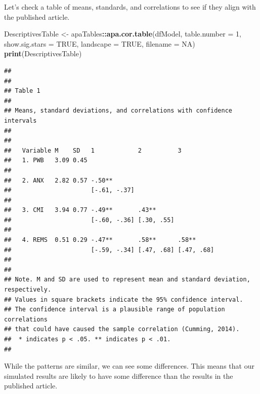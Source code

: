 \documentclass[
  11pt,
]{book}
\newenvironment{Shaded}{\begin{snugshade}}{\end{snugshade}}
\newcommand{\AttributeTok}[1]{\textcolor[rgb]{0.27,0.27,0.27}{#1}}
\newcommand{\ConstantTok}[1]{\textcolor[rgb]{0.37,0.37,0.37}{#1}}
\newcommand{\DecValTok}[1]{\textcolor[rgb]{0.06,0.06,0.06}{#1}}
\newcommand{\FunctionTok}[1]{\textcolor[rgb]{0.27,0.27,0.27}{\textbf{#1}}}
\newcommand{\NormalTok}[1]{#1}
\newcommand{\OtherTok}[1]{\textcolor[rgb]{0.37,0.37,0.37}{#1}}
\newcommand{\SpecialCharTok}[1]{\textcolor[rgb]{0.43,0.43,0.43}{\textbf{#1}}}
\begin{document}
Let's check a table of means, standards, and correlations to see if they align with the published article.

\begin{Shaded}
\begin{Highlighting}[]
\NormalTok{DescriptivesTable }\OtherTok{\textless{}{-}}\NormalTok{ apaTables}\SpecialCharTok{::}\FunctionTok{apa.cor.table}\NormalTok{(dfModel, }\AttributeTok{table.number =} \DecValTok{1}\NormalTok{,}
    \AttributeTok{show.sig.stars =} \ConstantTok{TRUE}\NormalTok{, }\AttributeTok{landscape =} \ConstantTok{TRUE}\NormalTok{, }\AttributeTok{filename =} \ConstantTok{NA}\NormalTok{)}
\FunctionTok{print}\NormalTok{(DescriptivesTable)}
\end{Highlighting}
\end{Shaded}

\begin{verbatim}
## 
## 
## Table 1 
## 
## Means, standard deviations, and correlations with confidence intervals
##  
## 
##   Variable M    SD   1            2          3         
##   1. PWB   3.09 0.45                                   
##                                                        
##   2. ANX   2.82 0.57 -.50**                            
##                      [-.61, -.37]                      
##                                                        
##   3. CMI   3.94 0.77 -.49**       .43**                
##                      [-.60, -.36] [.30, .55]           
##                                                        
##   4. REMS  0.51 0.29 -.47**       .58**      .58**     
##                      [-.59, -.34] [.47, .68] [.47, .68]
##                                                        
## 
## Note. M and SD are used to represent mean and standard deviation, respectively.
## Values in square brackets indicate the 95% confidence interval.
## The confidence interval is a plausible range of population correlations 
## that could have caused the sample correlation (Cumming, 2014).
##  * indicates p < .05. ** indicates p < .01.
## 
\end{verbatim}

While the patterns are similar, we can see some differences. This means that our simulated results are likely to have some difference than the results in the published article.
\end{document}
